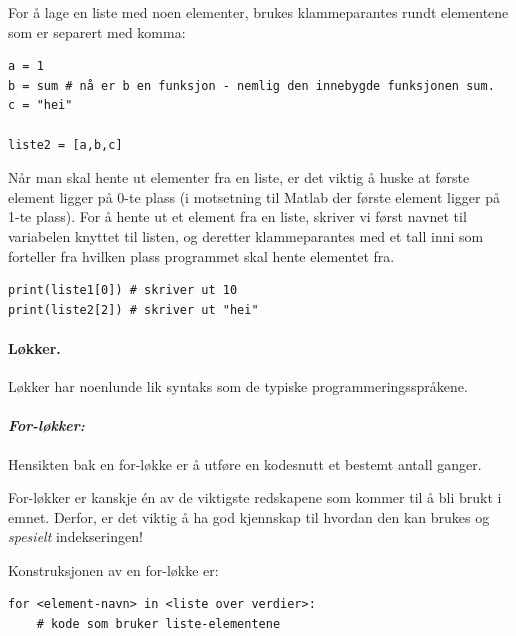 \documentclass[%
oneside,                 %
final,                   %
10pt,norsk]{article}
\begin{document}
For å lage en liste med noen elementer, brukes klammeparantes rundt elementene som er separert med komma:

\begin{verbatim}
a = 1
b = sum # nå er b en funksjon - nemlig den innebygde funksjonen sum.
c = "hei"

liste2 = [a,b,c]
\end{verbatim}

Når man skal hente ut elementer fra en liste, er det viktig å huske at første element ligger på 0-te plass (i motsetning til Matlab der første element ligger på 1-te plass).
For å hente ut et element fra en liste, skriver vi først navnet til variabelen knyttet til listen, og deretter klammeparantes med et tall inni som forteller fra hvilken plass programmet skal hente elementet fra.
\begin{verbatim}
print(liste1[0]) # skriver ut 10
print(liste2[2]) # skriver ut "hei"
\end{verbatim}

\paragraph{Løkker.}
Løkker har noenlunde lik syntaks som de typiske programmeringsspråkene.



\vspace{3mm}


\paragraph{\textit{For-løkker:}}


\vspace{3mm}


Hensikten bak en for-løkke er å utføre en kodesnutt et bestemt antall ganger.

For-løkker er kanskje én av de viktigste redskapene som kommer til å bli brukt i emnet.
Derfor, er det viktig å ha god kjennskap til hvordan den kan brukes og \emph{spesielt} indekseringen!

Konstruksjonen av en for-løkke er:
\begin{verbatim}
for <element-navn> in <liste over verdier>:
    # kode som bruker liste-elementene
\end{verbatim}
\end{document}
